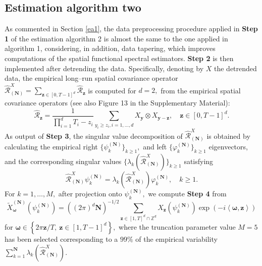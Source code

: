 \documentclass[11pt,a4paper]{article}
\begin{document}
\subsection{Estimation algorithm two}
\label{esa2}
As commented in Section \ref{ea1}, the data preprocessing procedure applied in  \textbf{Step 1} of the estimation algorithm 2 is almost the same to the one applied in algorithm 1, considering, in addition,    data tapering, which improves computations of  the spatial functional spectral estimators.  \textbf{Step 2} is then implemented after detrending the data. Specifically, denoting  by $X$  the  detrended data,   the  empirical long--run  spatial covariance operator $\widehat{\mathcal{R}}^{X}_{(\mathbf{N})}=\sum_{\mathbf{z}\in [0,T-1]^{d}}\widehat{\mathcal{R}}_{\mathbf{z}}$    is computed for $d=2,$   from the empirical spatial covariance operators (see also Figure 13 in the Supplementary Material):
\begin{equation}
\widehat{\mathcal{R}}_{\mathbf{z}}= \frac{1}{\prod_{i=1}^{d}T_{i}-z_{i}}\sum_{y_{i}\geq z_{i}, i=1,\dots,d}X_{\mathbf{y}}\otimes X_{\mathbf{y}-\mathbf{z}},\quad \mathbf{z}\in [0,T-1]^{d}.
\label{eqcomelrco}
\end{equation}
As output of  \textbf{Step 3}, the singular value decomposition of $\widehat{\mathcal{R}}^{X}_{(\mathbf{N})}$ is obtained by calculating
the empirical right $\{\psi_{k}^{(\mathbf{N})}\}_{k\geq 1},$ and left  $\{\varphi_{k}^{(\mathbf{N})}\}_{k\geq 1}$ eigenvectors, and the corresponding singular values $\{\lambda_{k}(\widehat{\mathcal{R}}^{X}_{(\mathbf{N})})\}_{k\geq 1}$ satisfying
$$\widehat{\mathcal{R}}_{(\mathbf{N})}^{X}\psi_{k}^{(\mathbf{N})}=\lambda_{k}(\widehat{\mathcal{R}}^{X}_{(\mathbf{N})})\varphi_{k}^{(\mathbf{N})},\quad k\geq 1.$$\noindent For $k=1,\dots, M,$ after projection onto $\psi_{k}^{(\mathbf{N})},$ we compute \textbf{Step 4} from
\begin{equation}
\widetilde{X}_{\boldsymbol{\omega }}^{(\mathbf{N})}(\psi_{k}^{(\mathbf{N})}) = ((2\pi)^{d} \mathbf{N})^{-1/2}\sum_{\mathbf{z}\in  [1,T]^{d}\cap  \mathbb{Z}^{d}} X_{\mathbf{z}}(\psi_{k}^{(\mathbf{N})})\exp\left(-i\left\langle \boldsymbol{\omega}, \mathbf{z}\right\rangle \right)
\label{dft}
\end{equation} \noindent for $\boldsymbol{\omega} \in \left\{2\pi \mathbf{z}/T,\ \mathbf{z}\in [1,T-1]^{d}\right\},$
 where the truncation parameter value $M=5$ has been selected corresponding to a $99\%$ of the empirical variability \linebreak $\sum_{k=1}^{\mathbf{N}}\lambda_{k}(\widehat{\mathcal{R}}^{X}_{(\mathbf{N})}).$
\end{document}
